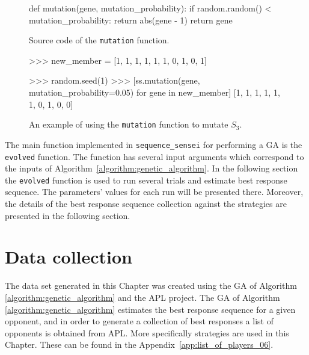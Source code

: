 \begin{figure}[!htbp]
    \begin{sourcepy}
def mutation(gene, mutation_probability):
    if random.random() < mutation_probability:
        return abs(gene - 1)
    return gene
\end{sourcepy}
\caption{Source code of the \texttt{mutation} function.}\label{fig:mutation_implementation}
\end{figure}

\begin{figure}[!htbp]
    \begin{usagepy}
>>> new_member = [1, 1, 1, 1, 1, 1, 0, 1, 0, 1]

>>> random.seed(1)
>>> [ss.mutation(gene, mutation_probability=0.05) for gene in new_member]
[1, 1, 1, 1, 1, 1, 0, 1, 0, 0]

\end{usagepy}
\caption{An example of using the \texttt{mutation} function to mutate
\(S_3\).}\label{fig:mutation_usage}
\end{figure}

The main function implemented in \texttt{sequence_sensei} for
performing a GA is the \texttt{evolved} function. The function has
several input arguments which correspond to the inputs of
Algorithm~\ref{algorithm:genetic_algorithm}. In the following section the
\texttt{evolved} function is used to run several trials and estimate
best response sequence. The parameters' values for each run will be presented there.
Moreover, the details of the best response sequence collection against the
\numberofstrategiesbestsequences strategies are presented in the following section.

\section{Data collection}\label{section:generating_sequences}

The data set generated in this Chapter was created using the GA of Algorithm
\ref{algorithm:genetic_algorithm} and the APL project. The GA of Algorithm
\ref{algorithm:genetic_algorithm} estimates the best response sequence for a given
opponent, and in order to generate a collection of best responses a list of
opponents is obtained from APL. More specifically \numberofstrategiesbestsequences strategies are used
in this Chapter. These can be found in the Appendix~\ref{app:list_of_players_06}.

